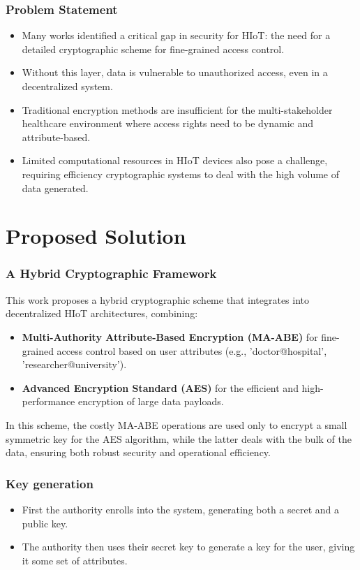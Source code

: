 \documentclass{beamer}
\begin{document}
\begin{frame}
    \frametitle{Problem Statement}
    \begin{itemize}
        \item Many works identified a critical gap in security for HIoT: the need for a detailed cryptographic scheme for fine-grained access control.
        \item Without this layer, data is vulnerable to unauthorized access, even in a decentralized system.
        \item Traditional encryption methods are insufficient for the multi-stakeholder healthcare environment where access rights need to be dynamic and attribute-based.
        \item Limited computational resources in HIoT devices also pose a challenge, requiring efficiency cryptographic systems to deal with the high volume of data generated.
    \end{itemize}
\end{frame}

\section{Proposed Solution}

\begin{frame}
    \frametitle{A Hybrid Cryptographic Framework}
    This work proposes a hybrid cryptographic scheme that integrates into decentralized HIoT architectures, combining:
    \begin{itemize}
        \item \textbf{Multi-Authority Attribute-Based Encryption (MA-ABE)} for fine-grained access control based on user attributes (e.g., 'doctor@hospital', 'researcher@university').
        \item \textbf{Advanced Encryption Standard (AES)} for the efficient and high-performance encryption of large data payloads.
    \end{itemize}
    In this scheme, the costly MA-ABE operations are used only to encrypt a small symmetric key for the AES algorithm, while the latter deals with the bulk of the data, ensuring both robust security and operational efficiency.
\end{frame}

\begin{frame}
    \frametitle{Key generation}
    \begin{itemize}
        \item First the authority enrolls into the system, generating both a secret and a public key.
        \item The authority then uses their secret key to generate a key for the user, giving it some set of attributes.
    \end{itemize}
\end{frame}
\end{document}
